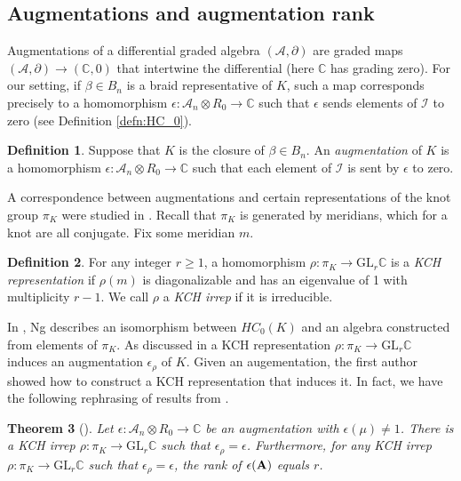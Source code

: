 \documentclass[11pt]{amsart}
\def\C{{\mathbb C}}
\def\A{{\mathcal A}}
\newtheorem{thm}{Theorem}[section]
\theoremstyle{definition}
\newtheorem{defn}[thm]{Definition}
\begin{document}
\subsection{Augmentations and augmentation rank}
\label{SecBG_AugRk}

  Augmentations of a differential graded algebra $(\A,\partial)$ are graded maps $(\A,\partial)\to (\C,0)$ that intertwine the differential (here $\C$ has grading zero). For our setting, if $\beta\in B_n$ is a braid representative of $K$, such a map corresponds precisely to a homomorphism $\epsilon:\A_n\otimes R_0\to\C$ such that $\epsilon$ sends elements of $\mathcal I$ to zero (see Definition \ref{defn:HC_0}).

  \begin{defn}
  Suppose that $K$ is the closure of $\beta\in B_n$. An \emph{augmentation} of $K$ is a homomorphism $\epsilon: \A_n\otimes R_0\rightarrow \C$ such that each element of $\mathcal I$ is sent by $\epsilon$ to zero.
  \label{defn:Aug}
  \end{defn}

  A correspondence between augmentations and certain representations of the knot group $\pi_K$ were studied in \cite{Cor13a}. Recall that $\pi_K$ is generated by meridians, which for a knot are all conjugate. Fix some meridian $m$.

  \begin{defn}
  For any integer $r\ge1$, a homomorphism $\rho:\pi_K\to\text{GL}_r\C$ is a \emph{KCH representation} if $\rho(m)$ is diagonalizable and has an eigenvalue of 1 with multiplicity $r-1$. We call $\rho$ a \emph{KCH irrep} if it is irreducible.
  \label{defn:KCHReps}
  \end{defn}

  In \cite{Ng08}, Ng describes an isomorphism between $HC_0(K)$ and an algebra constructed from elements of $\pi_K$. As discussed in \cite{Ng12} a KCH representation $\rho:\pi_K\to\text{GL}_r\C$ induces an augmentation $\epsilon_\rho$ of $K$. Given an augementation, the first author showed how to construct a KCH representation that induces it. In fact, we have the following rephrasing of results from \cite{Cor13a}.

  \begin{thm}[\cite{Cor13a}]
  Let $\epsilon:\A_n\otimes R_0\to\C$ be an augmentation with $\epsilon(\mu)\ne 1$. There is a KCH irrep $\rho:\pi_K\to\text{GL}_r\C$ such that $\epsilon_\rho=\epsilon$. Furthermore, for any KCH irrep $\rho:\pi_K\to\text{GL}_r\C$ such that $\epsilon_\rho = \epsilon$, the rank of $\epsilon({\bf A})$ equals $r$.
  \label{thm:AugKCH_Corresp}
  \end{thm}
\end{document}
